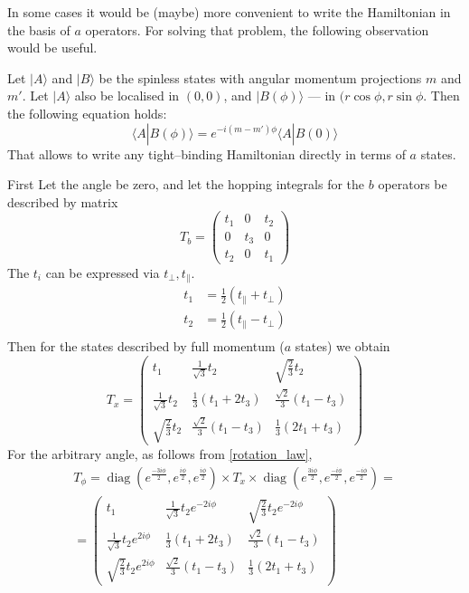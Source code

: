 \documentclass{article}
\DeclareMathOperator{\diag}{diag}
\begin{document}
In some cases it would be (maybe) more convenient to write the Hamiltonian in the basis 
of $a$ operators. For solving that problem, the following observation would be useful.

Let $|A\rangle$ and $|B\rangle$ be the spinless states with angular momentum projections $m$ and $m'$.
Let $|A\rangle$ also be localised in $(0,0)$, and $|B(\phi)\rangle$ --- in $(r\cos{\phi}, 
r\sin{\phi}$. Then the following equation holds:
\begin{equation}
	\label{rotation_law}
	\langle A | B(\phi) \rangle = e^{-i(m-m')\phi}\langle A | B(0) \rangle
\end{equation}
That allows to write any tight--binding Hamiltonian directly in terms of $a$ states.

First Let the angle be zero, and
let the hopping integrals for the $b$ operators be described by matrix
\begin{equation}
	T_b = \left(\begin{matrix}
			t_1 & 0 & t_2 \\
			0 & t_3 & 0 \\
			t_2 & 0 & t_1
		\end{matrix}\right)
\end{equation}
The $t_i$ can be expressed via $t_{\perp}, t_{\parallel}$. 
\begin{equation}
	\begin{split}
		t_1& = \frac 12 \left(t_{\parallel} + t_{\perp}\right)\\
		t_2& = \frac 12 \left(t_{\parallel} - t_{\perp}\right)\\
	\end{split}
\end{equation}
Then for the states described by full momentum ($a$ states) we obtain
\begin{equation}
	T_x = \left(\begin{matrix}
		t_1 & \frac{1}{\sqrt{3}} t_2 & \sqrt{\frac 23} t_2 \\
		\frac{1}{\sqrt{3}}t_2 & \frac{1}{3}(t_1 + 2t_3) &\frac{\sqrt{2}}{3}(t_1 - t_3)\\
		\sqrt{\frac 23}t_2 & \frac{\sqrt{2}}{3} (t_1 - t_3) & \frac{1}{3}(2t_1 + t_3) 
		\end{matrix} \right) 
\end{equation}
For the arbitrary angle, as follows from \ref{rotation_law}, 
\begin{multline}
	T_{\phi} = \diag(e^{\frac{-3i\phi}{2}},e^{\frac{i\phi}{2}},e^{\frac{i\phi}{2}})
				\times T_x 
				\times \diag(e^{\frac{3i\phi}{2}}, e^{\frac{-i\phi}{2}},e^{\frac{-i\phi}{2}}) =\\
	 =	\left(\begin{matrix}
		t_1 & \frac{1}{\sqrt{3}} t_2 e^{-2i\phi} & \sqrt{\frac 23} t_2e^{-2i\phi}  \\
		\frac{1}{\sqrt{3}}t_2 e^{2i\phi} & \frac{1}{3}(t_1 + 2t_3) 
														&\frac{\sqrt{2}}{3}(t_1 - t_3)\\
		\sqrt{\frac 23}t_2e^{2i\phi} &\frac{\sqrt{2}}{3} (t_1 - t_3) &\frac{1}{3}(2t_1 + t_3) 
		\end{matrix} \right) 
\end{multline}
\end{document}
